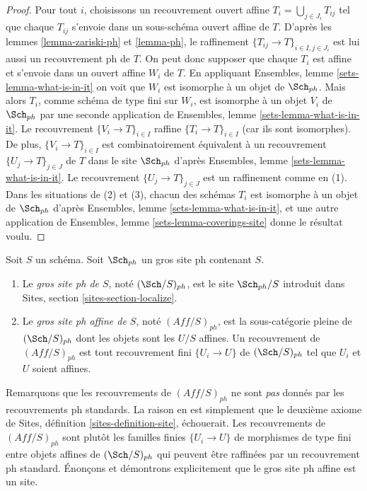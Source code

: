 \begin{proof}
Pour tout $i$, choisissons un recouvrement ouvert affine $T_i = \bigcup_{j \in J_i} T_{ij}$
tel que chaque $T_{ij}$ s'envoie dans un sous-schéma ouvert affine de $T$. D'après les
lemmes \ref{lemma-zariski-ph} et \ref{lemma-ph},
le raffinement $\{T_{ij} \to T\}_{i \in I, j \in J_i}$ est lui aussi un recouvrement ph
de $T$. On peut donc supposer que chaque $T_i$ est affine et s'envoie dans
un ouvert affine $W_i$ de $T$. En appliquant
Ensembles, lemme \ref{sets-lemma-what-is-in-it}
on voit que $W_i$ est isomorphe à un objet de $\Sch_{ph}$.
Mais alors $T_i$, comme schéma de type fini sur $W_i$,
est isomorphe à un objet $V_i$ de $\Sch_{ph}$ par une seconde
application de
Ensembles, lemme \ref{sets-lemma-what-is-in-it}.
Le recouvrement $\{V_i \to T\}_{i \in I}$ raffine $\{T_i \to T\}_{i \in I}$
(car ils sont isomorphes).
De plus, $\{V_i \to T\}_{i \in I}$ est combinatoirement équivalent à un
recouvrement $\{U_j \to T\}_{j \in J}$ de $T$ dans le site
$\Sch_{ph}$ d'après
Ensembles, lemme \ref{sets-lemma-what-is-in-it}.
Le recouvrement $\{U_j \to T\}_{j \in J}$ est un raffinement comme en (1).
Dans les situations de (2) et (3), chacun des
schémas $T_i$ est isomorphe à un objet de $\Sch_{ph}$ d'après
Ensembles, lemme \ref{sets-lemma-what-is-in-it},
et une autre application de
Ensembles, lemme \ref{sets-lemma-coverings-site}
donne le résultat voulu.
\end{proof}

\begin{definition}
\label{definition-big-small-ph}
Soit $S$ un schéma. Soit $\Sch_{ph}$ un gros site ph contenant $S$.
\begin{enumerate}
\item Le {\it gros site ph de $S$}, noté
$(\Sch/S)_{ph}$, est le site $\Sch_{ph}/S$
introduit dans Sites, section \ref{sites-section-localize}.
\item Le {\it gros site ph affine de $S$}, noté
$(\textit{Aff}/S)_{ph}$, est la sous-catégorie pleine de
$(\Sch/S)_{ph}$ dont les objets sont les $U/S$ affines.
Un recouvrement de $(\textit{Aff}/S)_{ph}$ est tout recouvrement fini
$\{U_i \to U\}$ de $(\Sch/S)_{ph}$ tel que $U_i$ et $U$ soient affines.
\end{enumerate}
\end{definition}

\noindent
Remarquons que les recouvrements de $(\textit{Aff}/S)_{ph}$ ne sont {\it pas}
donnés par les recouvrements ph standards. La raison en est simplement que
le deuxième axiome de Sites, définition \ref{sites-definition-site}, échouerait.
Les recouvrements de $(\textit{Aff}/S)_{ph}$ sont plutôt les familles finies
$\{U_i \to U\}$ de morphismes de type fini entre objets affines
de $(\Sch/S)_{ph}$ qui peuvent être raffinées par un recouvrement ph standard.
Énonçons et démontrons explicitement que le gros site ph affine est un site.


